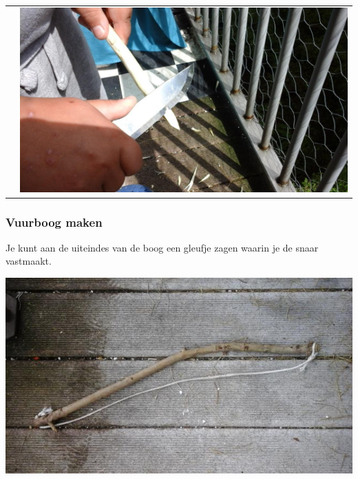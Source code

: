 \documentclass[a4paper, handout]{beamer}
\begin{document}
\begin{frame}
\begin{tabular}{ c c }
		&
		\includegraphics[scale=0.14]{boor-maken-4}
		\\
	\end{tabular}
\end{frame}

\begin{frame}
	\frametitle{Vuurboog maken}
	Je kunt aan de uiteindes van de boog een gleufje zagen waarin je de snaar vastmaakt.

	\includegraphics[scale=0.4]{vuurboog}
\end{frame}
\end{document}
